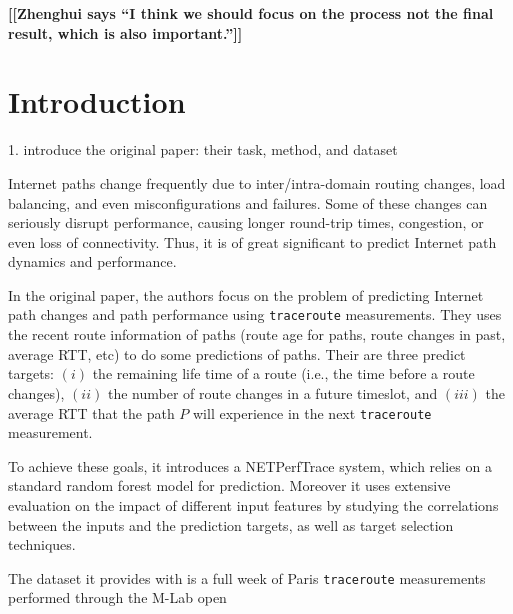 \documentclass[sigconf]{acmart}
\newcommand{\hui}[1]{{\bf \color{purple} [[Zhenghui says ``#1'']]}}
\begin{document}




  \maketitle
 
\hui{I think we should focus on the process not the final result, which is also important.}
 
\section{Introduction}
 
1. introduce the original paper: their task, method, and dataset
 
Internet paths change frequently due to inter/intra-domain routing changes, load balancing, and even misconfigurations and failures. Some of these changes can seriously disrupt performance, causing longer round-trip times, congestion, or even loss of connectivity. Thus, it is of great significant to predict Internet path dynamics and performance.
 

In the original paper, the authors focus on the problem of predicting Internet path changes and path performance using \texttt{traceroute} measurements. They uses the recent route information of paths (route age for paths, route changes in past, average RTT, etc) to do some predictions of paths. Their are three predict targets: $(i)$ the remaining life time of a route (i.e., the time before a route changes), $(ii)$ the number of route changes in a future timeslot, and $(iii)$ the average RTT  that the path $P$ will experience in the next \texttt{traceroute} measurement.

 
 

 
To achieve these goals, it introduces a NETPerfTrace system, which relies on a standard random forest model for prediction. Moreover it uses extensive evaluation on the impact of different input features by studying the correlations between the inputs and the prediction targets, as well as target selection techniques.
 

The dataset it provides with is a full week of Paris \texttt{traceroute} measurements performed through the M-Lab open
 
\end{document}
